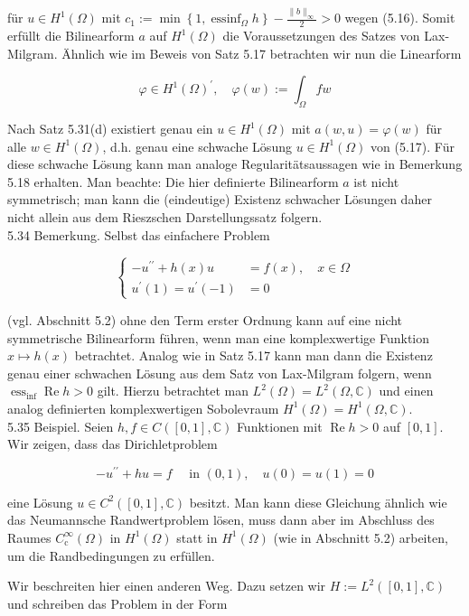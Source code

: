 \documentclass[10pt, letterpaper]{article}
\begin{document}
für $u \in H^{1}(\Omega)$ mit $c_{1}:=\min \left\{1, \operatorname{essinf}_{\Omega} h\right\}-\frac{\|b\|_{\infty}}{2}>0$ wegen (5.16). Somit erfüllt die Bilinearform $a$ auf $H^{1}(\Omega)$ die Voraussetzungen des Satzes von Lax-Milgram. Ähnlich wie im Beweis von Satz 5.17 betrachten wir nun die Linearform

$$
\varphi \in H^{1}(\Omega)^{\prime}, \quad \varphi(w):=\int_{\Omega} f w
$$

Nach Satz 5.31(d) existiert genau ein $u \in H^{1}(\Omega)$ mit $a(w, u)=\varphi(w)$ für alle $w \in H^{1}(\Omega)$, d.h. genau eine schwache Lösung $u \in H^{1}(\Omega)$ von (5.17). Für diese schwache Lösung kann man analoge Regularitätsaussagen wie in Bemerkung 5.18 erhalten. Man beachte: Die hier definierte Bilinearform $a$ ist nicht symmetrisch; man kann die (eindeutige) Existenz schwacher Lösungen daher nicht allein aus dem Rieszschen Darstellungssatz folgern.\\
5.34 Bemerkung. Selbst das einfachere Problem

$$
\left\{\begin{aligned}
-u^{\prime \prime}+h(x) u & =f(x), \quad x \in \Omega \\
u^{\prime}(1)=u^{\prime}(-1) & =0
\end{aligned}\right.
$$

(vgl. Abschnitt 5.2) ohne den Term erster Ordnung kann auf eine nicht symmetrische Bilinearform führen, wenn man eine komplexwertige Funktion $x \mapsto h(x)$ betrachtet. Analog wie in Satz 5.17 kann man dann die Existenz genau einer schwachen Lösung aus dem Satz von Lax-Milgram folgern, wenn $\operatorname{ess}_{\inf } \operatorname{Re} h>0$ gilt. Hierzu betrachtet man $L^{2}(\Omega)=L^{2}(\Omega, \mathbb{C})$ und einen analog definierten komplexwertigen Sobolevraum $H^{1}(\Omega)=H^{1}(\Omega, \mathbb{C})$.\\
5.35 Beispiel. Seien $h, f \in C([0,1], \mathbb{C})$ Funktionen mit $\operatorname{Re} h>0$ auf $[0,1]$. Wir zeigen, dass das Dirichletproblem

$$
-u^{\prime \prime}+h u=f \quad \text { in }(0,1), \quad u(0)=u(1)=0
$$

eine Lösung $u \in C^{2}([0,1], \mathbb{C})$ besitzt. Man kann diese Gleichung ähnlich wie das Neumannsche Randwertproblem lösen, muss dann aber im Abschluss des Raumes $C_{\mathrm{c}}^{\infty}(\Omega)$ in $H^{1}(\Omega)$ statt in $H^{1}(\Omega)$ (wie in Abschnitt 5.2) arbeiten, um die Randbedingungen zu erfüllen.

Wir beschreiten hier einen anderen Weg. Dazu setzen wir $H:=L^{2}([0,1], \mathbb{C})$ und schreiben das Problem in der Form
\end{document}
